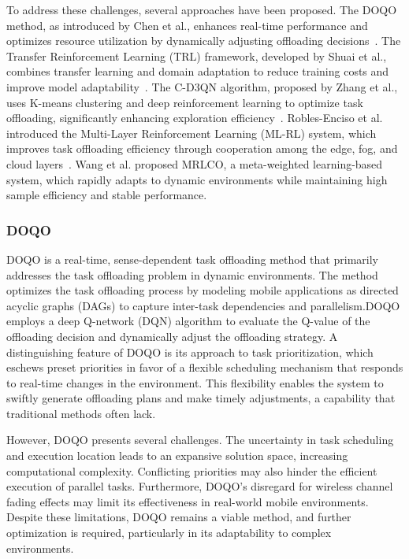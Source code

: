 \documentclass[journal]{IEEEtran}
\begin{document}
To address these challenges, several approaches have been proposed. The DOQO method, as introduced by Chen et al., enhances real-time performance and optimizes resource utilization by dynamically adjusting offloading decisions~\cite{zhou01}. The Transfer Reinforcement Learning (TRL) framework, developed by Shuai et al., combines transfer learning and domain adaptation to reduce training costs and improve model adaptability~\cite{zhou02}. The C-D3QN algorithm, proposed by Zhang et al., uses K-means clustering and deep reinforcement learning to optimize task offloading, significantly enhancing exploration efficiency~\cite{zhou03}. Robles-Enciso et al. introduced the Multi-Layer Reinforcement Learning (ML-RL) system, which improves task offloading efficiency through cooperation among the edge, fog, and cloud layers~\cite{zhou04}. Wang et al. proposed MRLCO, a meta-weighted learning-based system, which rapidly adapts to dynamic environments while maintaining high sample efficiency and stable performance.~\cite{zhou05}

\subsubsection{DOQO}

DOQO is a real-time, sense-dependent task offloading method that primarily addresses the task offloading problem in dynamic environments. The method optimizes the task offloading process by modeling mobile applications as directed acyclic graphs (DAGs) to capture inter-task dependencies and parallelism.DOQO employs a deep Q-network (DQN) algorithm to evaluate the Q-value of the offloading decision and dynamically adjust the offloading strategy. A distinguishing feature of DOQO is its approach to task prioritization, which eschews preset priorities in favor of a flexible scheduling mechanism that responds to real-time changes in the environment. This flexibility enables the system to swiftly generate offloading plans and make timely adjustments, a capability that traditional methods often lack. 

However, DOQO presents several challenges. The uncertainty in task scheduling and execution location leads to an expansive solution space, increasing computational complexity. Conflicting priorities may also hinder the efficient execution of parallel tasks. Furthermore, DOQO's disregard for wireless channel fading effects may limit its effectiveness in real-world mobile environments. Despite these limitations, DOQO remains a viable method, and further optimization is required, particularly in its adaptability to complex environments.~\cite{zhou01}
\end{document}
